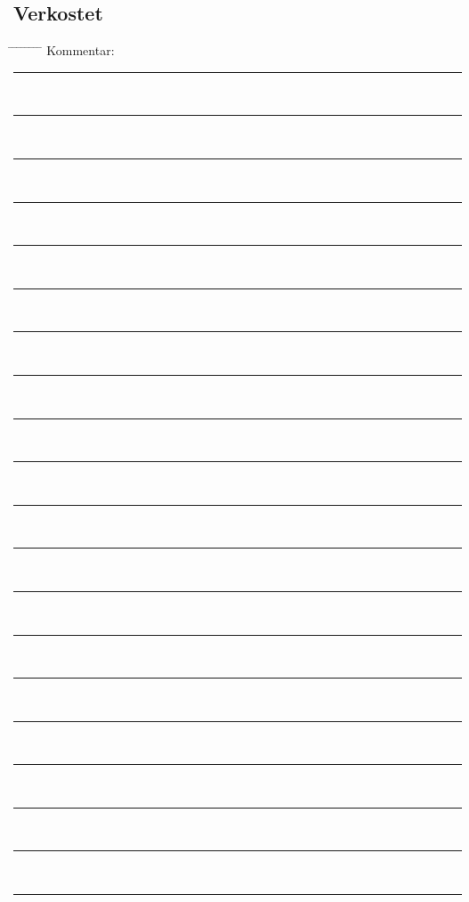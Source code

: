 \documentclass[12pt,oneside,a4paper]{scrartcl}
\begin{document}
{\subsection*{Verkostet}
\begin{tabbing}
	\hspace{1cm} \= \hspace{1cm} \= \hspace{1cm} \= \hspace{1cm} \= \hspace{1cm} \= \hspace{1cm} \= \hspace{1cm} \= \hspace{1cm} \= \kill
	\> Kommentar: \>\>\> \rule[-0.2cm]{13cm}{1pt}\\
	\> \>  \rule[-0.2cm]{15.3cm}{1pt}\\
	\> \>  \rule[-0.2cm]{15.3cm}{1pt}\\
	\> \>  \rule[-0.2cm]{15.3cm}{1pt}\\		
	\> \>  \rule[-0.2cm]{15.3cm}{1pt}\\
	\> \>  \rule[-0.2cm]{15.3cm}{1pt}\\
	\> \>  \rule[-0.2cm]{15.3cm}{1pt}\\
	\> \>  \rule[-0.2cm]{15.3cm}{1pt}\\
	\> \>  \rule[-0.2cm]{15.3cm}{1pt}\\
	\> \>  \rule[-0.2cm]{15.3cm}{1pt}\\
	\> \>  \rule[-0.2cm]{15.3cm}{1pt}\\
	\> \>  \rule[-0.2cm]{15.3cm}{1pt}\\
	\> \>  \rule[-0.2cm]{15.3cm}{1pt}\\
	\> \>  \rule[-0.2cm]{15.3cm}{1pt}\\
	\> \>  \rule[-0.2cm]{15.3cm}{1pt}\\
	\> \>  \rule[-0.2cm]{15.3cm}{1pt}\\
	\> \>  \rule[-0.2cm]{15.3cm}{1pt}\\
	\> \>  \rule[-0.2cm]{15.3cm}{1pt}\\
	\> \>  \rule[-0.2cm]{15.3cm}{1pt}\\
	\> \>  \rule[-0.2cm]{15.3cm}{1pt}
\end{tabbing}}
\end{document}
